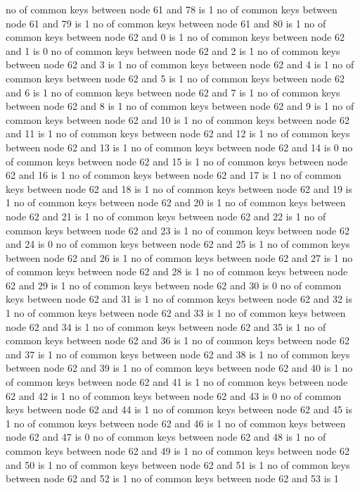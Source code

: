 no of common keys between node 61 and 78 is 1
no of common keys between node 61 and 79 is 1
no of common keys between node 61 and 80 is 1
no of common keys between node 62 and 0 is 1
no of common keys between node 62 and 1 is 0
no of common keys between node 62 and 2 is 1
no of common keys between node 62 and 3 is 1
no of common keys between node 62 and 4 is 1
no of common keys between node 62 and 5 is 1
no of common keys between node 62 and 6 is 1
no of common keys between node 62 and 7 is 1
no of common keys between node 62 and 8 is 1
no of common keys between node 62 and 9 is 1
no of common keys between node 62 and 10 is 1
no of common keys between node 62 and 11 is 1
no of common keys between node 62 and 12 is 1
no of common keys between node 62 and 13 is 1
no of common keys between node 62 and 14 is 0
no of common keys between node 62 and 15 is 1
no of common keys between node 62 and 16 is 1
no of common keys between node 62 and 17 is 1
no of common keys between node 62 and 18 is 1
no of common keys between node 62 and 19 is 1
no of common keys between node 62 and 20 is 1
no of common keys between node 62 and 21 is 1
no of common keys between node 62 and 22 is 1
no of common keys between node 62 and 23 is 1
no of common keys between node 62 and 24 is 0
no of common keys between node 62 and 25 is 1
no of common keys between node 62 and 26 is 1
no of common keys between node 62 and 27 is 1
no of common keys between node 62 and 28 is 1
no of common keys between node 62 and 29 is 1
no of common keys between node 62 and 30 is 0
no of common keys between node 62 and 31 is 1
no of common keys between node 62 and 32 is 1
no of common keys between node 62 and 33 is 1
no of common keys between node 62 and 34 is 1
no of common keys between node 62 and 35 is 1
no of common keys between node 62 and 36 is 1
no of common keys between node 62 and 37 is 1
no of common keys between node 62 and 38 is 1
no of common keys between node 62 and 39 is 1
no of common keys between node 62 and 40 is 1
no of common keys between node 62 and 41 is 1
no of common keys between node 62 and 42 is 1
no of common keys between node 62 and 43 is 0
no of common keys between node 62 and 44 is 1
no of common keys between node 62 and 45 is 1
no of common keys between node 62 and 46 is 1
no of common keys between node 62 and 47 is 0
no of common keys between node 62 and 48 is 1
no of common keys between node 62 and 49 is 1
no of common keys between node 62 and 50 is 1
no of common keys between node 62 and 51 is 1
no of common keys between node 62 and 52 is 1
no of common keys between node 62 and 53 is 1
